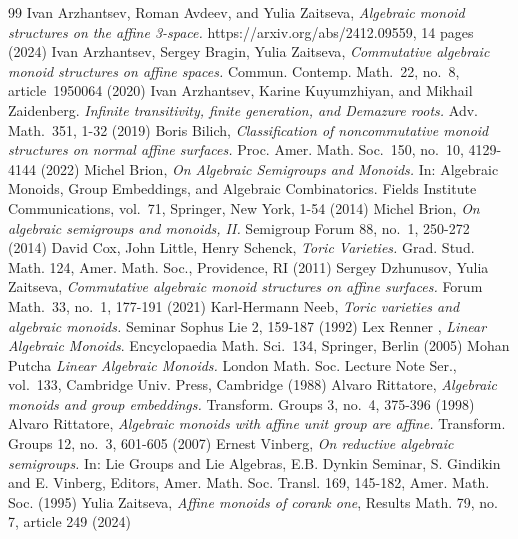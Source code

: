 \documentclass[a4paper, 11pt]{amsart}
\theoremstyle{plain}
\theoremstyle{remark}
\theoremstyle{definition}
\begin{document}
	
	\begin{thebibliography}{99}
		 {\sc Ivan Arzhantsev, Roman Avdeev, and Yulia Zaitseva}, {\em Algebraic monoid structures on the affine 3-space.} https://arxiv.org/abs/2412.09559, 14 pages (2024)
		 {\sc Ivan Arzhantsev, Sergey Bragin, Yulia Zaitseva}, {\em Commutative algebraic monoid structures on affine spaces.} Commun. Contemp. Math.~22, no.~8, article~1950064 (2020)
		 {\sc Ivan Arzhantsev, Karine Kuyumzhiyan, and Mikhail Zaidenberg.} {\em Infinite transitivity, finite generation, and Demazure roots.} Adv. Math.~351, 1-32 (2019)
		 {\sc Boris Bilich}, {\em Classification of noncommutative monoid structures on normal affine surfaces.}  Proc. Amer. Math. Soc.~150, no.~10, 4129-4144 (2022)
		{\sc Michel Brion}, {\em On Algebraic Semigroups and Monoids.} In: Algebraic Monoids, Group Embeddings, and Algebraic Combinatorics. Fields Institute Communications, vol.~71, Springer, New York, 1-54 (2014)
		{\sc Michel Brion}, {\em On algebraic semigroups and monoids, II.} Semigroup Forum 88, no.~1, 250-272 (2014)
		 {\sc David Cox, John Little, Henry Schenck}, {\em Toric Varieties.} Grad. Stud. Math. 124, Amer. Math. Soc., Providence, RI (2011)
		 {\sc Sergey Dzhunusov, Yulia Zaitseva}, {\em Commutative algebraic monoid structures on affine surfaces.} Forum Math.~33, no.~1, 177-191 (2021)
		 {\sc Karl-Hermann Neeb}, {\em Toric varieties and algebraic monoids.} Seminar Sophus Lie 2, 159-187  (1992)
		 {\sc Lex Renner }, \emph{Linear Algebraic Monoids}. Encyclopaedia Math. Sci.~134, Springer, Berlin (2005)
		 {\sc Mohan Putcha} \emph{Linear Algebraic Monoids.} London Math. Soc. Lecture Note Ser., vol.~133, Cambridge Univ. Press, Cambridge (1988)
		 {\sc Alvaro Rittatore}, {\em Algebraic monoids and group embeddings.} Transform. Groups 3, no.~4, 375-396 (1998)
		 {\sc Alvaro Rittatore}, {\em  Algebraic monoids with affine unit group are affine.} Transform. Groups 12, no.~3, 601-605 (2007)
		 {\sc Ernest Vinberg}, {\em On reductive algebraic semigroups.} In: Lie Groups and Lie Algebras, E.B. Dynkin
		Seminar, S. Gindikin and E. Vinberg, Editors, Amer. Math. Soc. Transl. 169, 145-182, Amer. Math. Soc. (1995)
		 {\sc Yulia Zaitseva}, {\em Affine monoids of corank one}, Results Math. 79, no. 7, article 249 (2024)
	\end{thebibliography}
\end{document}
